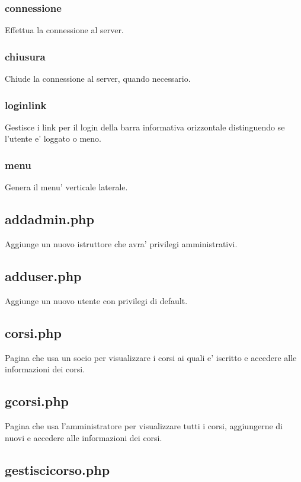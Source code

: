 \subsubsection{connessione}
Effettua la connessione al server.

\subsubsection{chiusura}
Chiude la connessione al server, quando necessario.

\subsubsection{loginlink}
Gestisce i link per il login della barra informativa orizzontale distinguendo se l'utente e' loggato o meno.

\subsubsection{menu}

Genera il menu' verticale laterale.

\subsection{addadmin.php}

Aggiunge un nuovo istruttore che avra' privilegi amministrativi.


\subsection{adduser.php}

Aggiunge un nuovo utente con privilegi di default.

\subsection{corsi.php}

Pagina che usa un socio per visualizzare i corsi ai quali e' iscritto e accedere alle informazioni dei corsi.


\subsection{gcorsi.php}

Pagina che usa l'amministratore per visualizzare tutti i corsi, aggiungerne di nuovi e accedere alle informazioni dei corsi.

\subsection{gestiscicorso.php}

